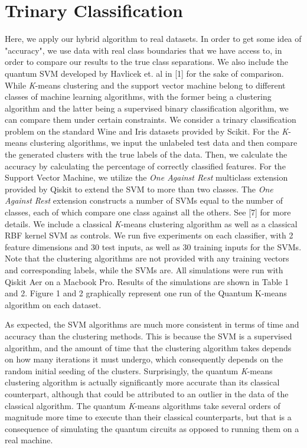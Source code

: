 \documentclass[twocolumn, english]{revtex4-2}
\begin{document}
\section{Trinary Classification}
Here, we apply our hybrid algorithm to real datasets. In order to get some idea of "accuracy", we use data with real class boundaries that we have access to, in order to compare our results to the true class separations. We also include the quantum SVM developed by Havlicek et. al in [1] for the sake of comparison. While \textit{K}-means clustering and the support vector machine belong to different classes of machine learning algorithms, with the former being a clustering algorithm and the latter being a supervised binary classification algorithm, we can compare them under certain constraints. We consider a trinary classification problem on the standard Wine and Iris datasets provided by Scikit. For the \textit{K}-means clustering algorithms, we input the unlabeled test data and then compare the generated clusters with the true labels of the data. Then, we calculate the accuracy by calculating the percentage of correctly classified features. For the Support Vector Machine, we utilize the \textit{One Against Rest} multiclass extension provided by Qiskit to extend the SVM to more than two classes. The \textit{One Against Rest} extension constructs a number of SVMs equal to the number of classes, each of which compare one class against all the others. See [7] for more details. We include a classical \textit{K}-means clustering algorithm as well as a classical RBF kernel SVM as controls. We run five experiments on each classifier, with 2 feature dimensions and 30 test inputs, as well as 30 training inputs for the SVMs. Note that the clustering algorithms are not provided with any training vectors and corresponding labels, while the SVMs are. All simulations were run with Qiskit Aer on a Macbook Pro. Results of the simulations are shown in Table 1 and 2. Figure 1 and 2 graphically represent one run of the Quantum K-means algorithm on each dataset.

As expected, the SVM algorithms are much more consistent in terms of time and accuracy than the clustering methods. This is because the SVM is a supervised algorithm, and the amount of time that the clustering algorithm takes depends on how many iterations it must undergo, which consequently depends on the random initial seeding of the clusters. Surprisingly, the quantum \textit{K}-means clustering algorithm is actually significantly more accurate than its classical counterpart, although that could be attributed to an outlier in the data of the classical algorithm. The quantum \textit{K}-means algorithms take several orders of magnitude more time to execute than their classical counterparts, but that is a consequence of simulating the quantum circuits as opposed to running them on a real machine.
\end{document}
